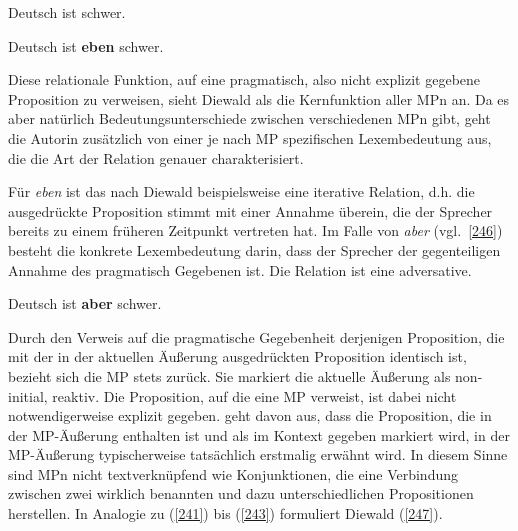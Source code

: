 \begin{exe}
	\ex\label{244} 
	Deutsch ist schwer.
\end{exe}
\begin{exe}
	\ex\label{245} 
	Deutsch ist \textbf{eben} schwer.
\end{exe}
Diese relationale Funktion, auf eine pragmatisch, also nicht explizit gegebene Proposition zu verweisen, sieht Diewald als die Kernfunktion aller MPn an. Da es aber natürlich Bedeutungsunterschiede zwischen verschiedenen MPn gibt, geht die Autorin zusätzlich von einer je nach MP spezifischen Lexembedeutung aus, die die Art der Relation genauer charakterisiert. 
	
Für \textit{eben} ist das nach Diewald beispielsweise eine iterative Relation, d.h. die ausgedrückte Proposition stimmt mit einer Annahme überein, die der Sprecher bereits zu einem früheren Zeitpunkt vertreten hat. Im Falle von \textit{aber} (vgl.\ \ref{246}) besteht die konkrete Lexembedeutung darin, dass der Sprecher der gegenteiligen Annahme des pragmatisch Gegebenen ist. Die Relation ist eine adversative.

\begin{exe}
	\ex\label{246} 
	Deutsch ist \textbf{aber} schwer.
\end{exe}
Durch den Verweis auf die pragmatische Gegebenheit derjenigen Proposition, die mit der in der aktuellen Äußerung ausgedrückten Proposition identisch ist, bezieht sich die MP stets zurück. Sie markiert die aktuelle Äußerung als non-initial, reaktiv. Die Proposition, auf die eine MP verweist, ist dabei nicht notwendigerweise explizit gegeben. \citet[417]{Diewald2006} geht davon aus, dass die Proposition, die in der MP-Äußerung enthalten ist und als im Kontext gegeben markiert wird, in der MP-Äußerung typischerweise tatsächlich erstmalig erwähnt wird. In diesem Sinne sind MPn nicht textverknüpfend wie Konjunktionen, die eine Verbindung zwischen zwei wirklich benannten und dazu unterschiedlichen Propositionen herstellen. In Analogie zu (\ref{241}) bis (\ref{243}) formuliert Diewald (\ref{247}).

